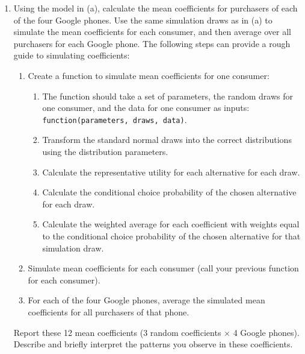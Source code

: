 \documentclass[11pt,letterpaper]{article}
\begin{document}
\begin{enumerate}[label=\alph*., leftmargin=*]
	\item Using the model in (a), calculate the mean coefficients for purchasers of each of the four Google phones. Use the same simulation draws as in (a) to simulate the mean coefficients for each consumer, and then average over all purchasers for each Google phone. The following steps can provide a rough guide to simulating coefficients:
	\begin{enumerate}[label=\Roman*.]
		\item Create a function to simulate mean coefficients for one consumer:
		\begin{enumerate}[label=\roman*.]
			\item The function should take a set of parameters, the random draws for one consumer, and the data for one consumer as inputs: \texttt{function(parameters, draws, data)}.
			\item Transform the standard normal draws into the correct distributions using the distribution parameters.
			\item Calculate the representative utility for each alternative for each draw.
			\item Calculate the conditional choice probability of the chosen alternative for each draw.
			\item Calculate the weighted average for each coefficient with weights equal to the conditional choice probability of the chosen alternative for that simulation draw.
		\end{enumerate}
		\item Simulate mean coefficients for each consumer (call your previous function for each consumer).
		\item For each of the four Google phones, average the simulated mean coefficients for all purchasers of that phone.
	\end{enumerate}
	Report these 12 mean coefficients (3 random coefficients $\times$ 4 Google phones). Describe and briefly interpret the patterns you observe in these coefficients.


\end{enumerate}
\end{document}
